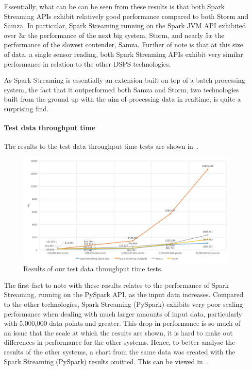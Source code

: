 Essentially, what can be can be seen from these results is that both Spark Streaming APIs exhibit relatively good performance
compared to both Storm and Samza. In particular, Spark Streaming running on the Spark JVM API exhibited over $3x$ the
performance of the next big system, Storm, and nearly $5x$ the performance of the slowest contender, Samza. Further of
note is that at this size of data, a single sensor reading, both Spark Streaming APIs exhibit very similar performance
in relation to the other DSPS technologies.

As Spark Streaming is essentially an extension built on top of a batch processing system, the fact that it outperformed
both Samza and Storm, two technologies built from the ground up with the aim of processing data in realtime, is quite a
surprising find.

\paragraph{Test data throughput time}

The results to the test data throughput time tests are shown in~.

\begin{figure}[H]
  \centering
  \includegraphics[width=1\textwidth]{includes/figures/fig_throughput_res}
  \caption{Results of our test data throughput time tests.}
  \label{fig:throughput_time_res}
\end{figure}

The first fact to note with these results relates to the performance of Spark Streaming, running on the PySpark API, as the
input data increases. Compared to the other technologies, Spark Streaming (PySpark) exhibits very poor scaling performance
when dealing with much larger amounts of input data, particularly with 5,\@000,\@000 data points and greater. This drop in
performance is so much of an issue that the scale at which the results are shown, it is hard to make out differences in
performance for the other systems. Hence, to better analyse the results of the other systems, a chart from the same
data was created with the Spark Streaming (PySpark) results omitted. This can be viewed in~.

